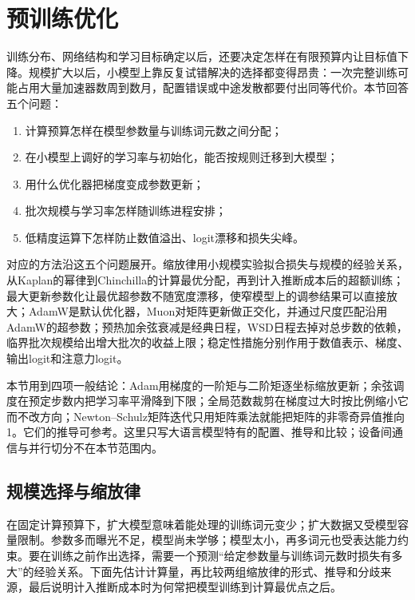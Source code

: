 \section{预训练优化}
\label{sec:nlp-llm-optimization}

训练分布、网络结构和学习目标确定以后，还要决定怎样在有限预算内让目标值下降。规模扩大以后，小模型上靠反复试错解决的选择都变得昂贵：一次完整训练可能占用大量加速器数周到数月，配置错误或中途发散都要付出同等代价。本节回答五个问题：

\begin{enumerate}
  \item 计算预算怎样在模型参数量与训练词元数之间分配；
  \item 在小模型上调好的学习率与初始化，能否按规则迁移到大模型；
  \item 用什么优化器把梯度变成参数更新；
  \item 批次规模与学习率怎样随训练进程安排；
  \item 低精度运算下怎样防止数值溢出、logit漂移和损失尖峰。
\end{enumerate}

对应的方法沿这五个问题展开。缩放律用小规模实验拟合损失与规模的经验关系，从Kaplan的幂律到Chinchilla的计算最优分配，再到计入推断成本后的超额训练；最大更新参数化让最优超参数不随宽度漂移，使窄模型上的调参结果可以直接放大；AdamW是默认优化器，Muon对矩阵更新做正交化，并通过尺度匹配沿用AdamW的超参数；预热加余弦衰减是经典日程，WSD日程去掉对总步数的依赖，临界批次规模给出增大批次的收益上限；稳定性措施分别作用于数值表示、梯度、输出logit和注意力logit。

本节用到四项一般结论：Adam用梯度的一阶矩与二阶矩逐坐标缩放更新；余弦调度在预定步数内把学习率平滑降到下限；全局范数裁剪在梯度过大时按比例缩小它而不改方向；Newton--Schulz矩阵迭代只用矩阵乘法就能把矩阵的非零奇异值推向1。它们的推导可参考。这里只写大语言模型特有的配置、推导和比较；设备间通信与并行切分不在本节范围内。

\subsection{规模选择与缩放律}
\label{sec:nlp-llm-compute-allocation}

在固定计算预算下，扩大模型意味着能处理的训练词元变少；扩大数据又受模型容量限制。参数多而曝光不足，模型尚未学够；模型太小，再多词元也受表达能力约束。要在训练之前作出选择，需要一个预测“给定参数量与训练词元数时损失有多大”的经验关系。下面先估计计算量，再比较两组缩放律的形式、推导和分歧来源，最后说明计入推断成本时为何常把模型训练到计算最优点之后。

